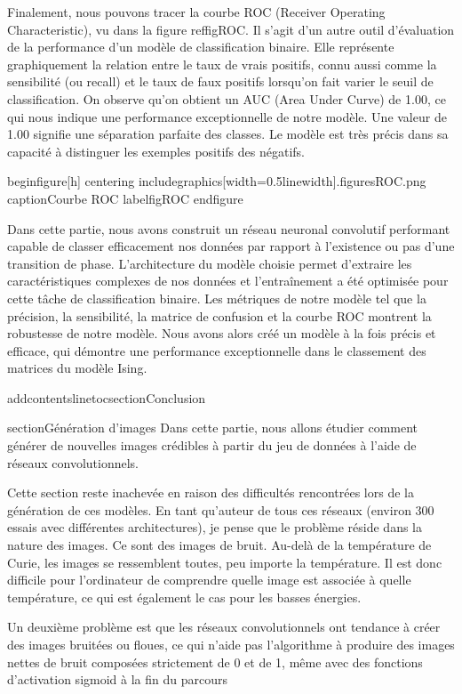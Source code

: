 Finalement, nous pouvons tracer la courbe ROC (Receiver Operating Characteristic), vu dans la figure ref{figROC}. Il s’agit d’un autre outil d’évaluation de la performance d’un modèle de classification binaire. Elle représente graphiquement la relation entre le taux de vrais positifs, connu aussi comme la sensibilité (ou recall) et le taux de faux positifs lorsqu’on fait varier le seuil de classification. On observe qu’on obtient un AUC (Area Under Curve) de 1.00, ce qui nous indique une performance exceptionnelle de notre modèle. Une valeur de 1.00 signifie une séparation parfaite des classes. Le modèle est très précis dans sa capacité à distinguer les exemples positifs des négatifs.

begin{figure}[h]
	centering
	includegraphics[width=0.5linewidth]{.figuresROC.png}
	caption{Courbe ROC}
	label{figROC}
end{figure}

Dans cette partie, nous avons construit un réseau neuronal convolutif performant capable de classer efficacement nos données par rapport à l’existence ou pas d’une transition de phase. L’architecture du modèle choisie permet d’extraire les caractéristiques complexes de nos données et l’entraînement a été optimisée pour cette tâche de classification binaire. Les métriques de notre modèle tel que la précision, la sensibilité, la matrice de confusion et la courbe ROC montrent la robustesse de notre modèle. Nous avons alors créé un modèle à la fois précis et efficace, qui démontre une performance exceptionnelle dans le classement des matrices du modèle Ising.

addcontentsline{toc}{section}{Conclusion}

section{Génération d'images}
Dans cette partie, nous allons étudier comment générer de nouvelles images crédibles à partir du jeu de données à l'aide de réseaux convolutionnels.

Cette section reste inachevée en raison des difficultés rencontrées lors de la génération de ces modèles. En tant qu'auteur de tous ces réseaux (environ 300 essais avec différentes architectures), je pense que le problème réside dans la nature des images. Ce sont des images de bruit. Au-delà de la température de Curie, les images se ressemblent toutes, peu importe la température. Il est donc difficile pour l'ordinateur de comprendre quelle image est associée à quelle température, ce qui est également le cas pour les basses énergies.

Un deuxième problème est que les réseaux convolutionnels ont tendance à créer des images bruitées ou floues, ce qui n'aide pas l'algorithme à produire des images nettes de bruit composées strictement de 0 et de 1, même avec des fonctions d'activation sigmoid à la fin du parcours

